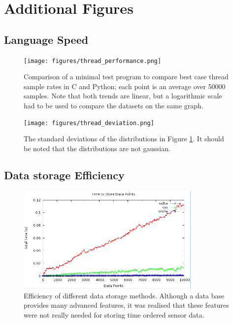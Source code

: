\section*{Additional Figures}

\subsection*{Language Speed}

\begin{figure}[H]
	\centering
	\texttt{[image: figures/thread\_performance.png]}
	\caption{Comparison of a minimal test program to compare best case thread sample rates in C and Python; each point is an average over 50000 samples. Note that both trends are linear, but a logarithmic scale had to be used to compare the datasets on the same graph.}
	\label{thread_performance.png}
\end{figure}


\begin{figure}[H]
	\centering
	\texttt{[image: figures/thread\_deviation.png]}
	\caption{The standard deviations of the distributions in Figure \ref{thread_performance.png}. It should be noted that the distributions are not gaussian.}
\end{figure}




\subsection*{Data storage Efficiency}

\begin{figure}[H]
	\centering
	\includegraphics[width=0.8\textwidth]{figures/data_storespeed.png}
	\caption{Efficiency of different data storage methods. Although a data base provides many advanced features, it was realised that these features were not really needed for storing time ordered sensor data.}
\end{figure}

